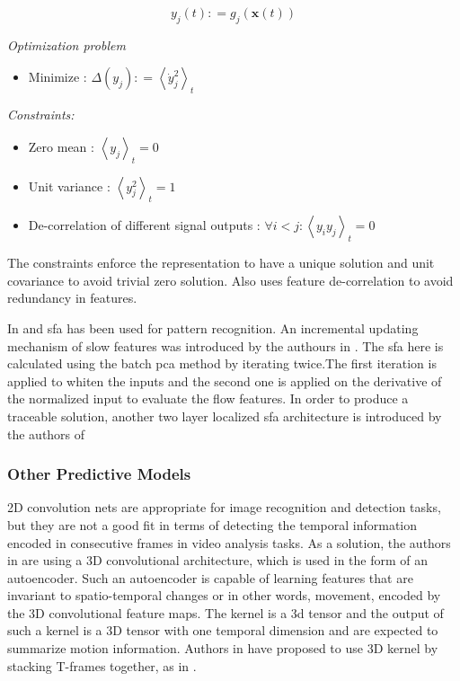 \documentclass[a4paper,12pt]{report}
\begin{document}
\begin{itemize}
\begin{equation}
    y _ { j } ( t ) : = g _ { j } ( \mathbf { x } ( t ) )
\end{equation}

\emph{Optimization problem}
\begin{itemize}
    \item Minimize : $\Delta \left( y _ { j } \right) : = \left\langle \dot { y } _ { j } ^ { 2 } \right\rangle _ { t }$
\end{itemize}


\emph{Constraints:}
\begin{itemize}
    \item Zero mean : $\left\langle y _ { j } \right\rangle _ { t } = 0$
    \item Unit variance : $\left\langle y _ { j } ^ { 2 } \right\rangle _ { t } = 1$
    \item De-correlation of different signal outputs : $\forall i < j : \left\langle y _ { i } y _ { j } \right\rangle _ { t } = 0$
\end{itemize}


The constraints enforce the representation to have a unique solution and unit covariance to avoid trivial zero solution. Also uses feature de-correlation to avoid redundancy in features.

In \cite{58} and \cite{59} \gls{sfa} has been used for pattern recognition. An incremental updating mechanism of slow features was introduced by the authours in \cite{60}. The \gls{sfa} here is calculated using the batch \gls{pca} method by iterating twice.The first iteration is applied to whiten the inputs and the second one is applied on the derivative of
the normalized input to evaluate the flow features. In order to produce a traceable solution, another two layer localized \gls{sfa} architecture is introduced by the authors of \cite{61} 

\subsubsection{Other Predictive Models}

2D convolution nets are appropriate for image recognition and detection tasks, but they are not a good fit in terms of detecting the temporal information encoded in consecutive frames in video analysis tasks. As a solution, the authors in \cite{20} are using a 3D convolutional architecture, which is used in the form of an autoencoder. Such an autoencoder is capable of learning features that are invariant to spatio-temporal changes or in other words, movement, encoded by the 3D convolutional feature maps. The kernel is a 3d tensor and the output of such a kernel is a 3D tensor with one temporal dimension and are expected to summarize motion information. Authors in \cite{55} have proposed to use 3D kernel by stacking T-frames together, as in \cite{34}.


\end{itemize}
\end{document}
